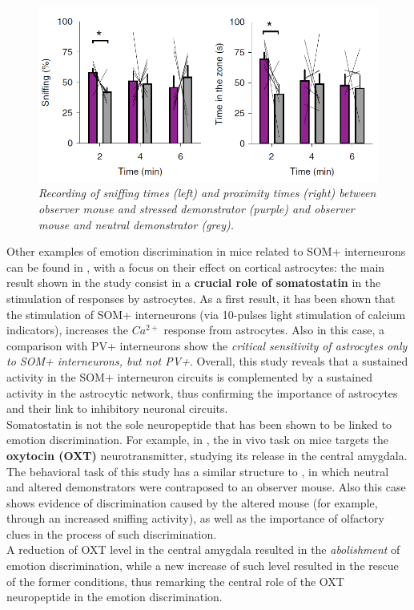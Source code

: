 \documentclass[12pt, a4paper]{report}
\begin{document}
	\begin{figure}
	\begin{center}
		\includegraphics[scale=0.68]{scheggia.png} 
	\end{center} 
	\caption{\textit{Recording of sniffing times (left) and proximity times (right) between observer mouse and stressed demonstrator (purple) and observer mouse and neutral demonstrator (grey).}} \label{Scheggia}
	
\end{figure}


Other examples of emotion discrimination in mice related to SOM+ interneurons can be found in \cite{9}, %
 with a focus on their effect on cortical astrocytes: the main result shown in the study consist in a \textbf{crucial role of somatostatin} in the stimulation of responses by astrocytes.
As a first result, it has been shown that the stimulation of SOM+ interneurons (via 10-pulses light stimulation of calcium indicators), increases the $Ca^{2+}$ response from astrocytes. Also in this case, a comparison with PV+ interneurons show the \textit{critical sensitivity of astrocytes only to SOM+ interneurons, but not PV+}. Overall, this study reveals that a sustained activity in the SOM+ interneuron circuits is complemented by
a sustained activity in the astrocytic network, thus confirming the importance of astrocytes and their link to inhibitory neuronal circuits. 
\\

Somatostatin is not the sole neuropeptide that has been shown to be linked to emotion discrimination. For example, in \cite{10}, %
the in vivo task on mice targets the \textbf{oxytocin (OXT)} neurotransmitter, studying its release in the central amygdala. The behavioral task of this study has a similar structure to \cite{8}, in which neutral and altered demonstrators were contraposed to an observer mouse. Also this case shows evidence of  discrimination caused by the altered mouse (for example, through an increased sniffing activity), as well as the importance of olfactory clues in the process of such discrimination.\\
A reduction of  OXT level in the central amygdala resulted in the \textit{abolishment} of emotion discrimination, while a new increase of such level resulted in the rescue of the former conditions, thus remarking the central role of the OXT neuropeptide in the emotion discrimination.
\\
\end{document}
